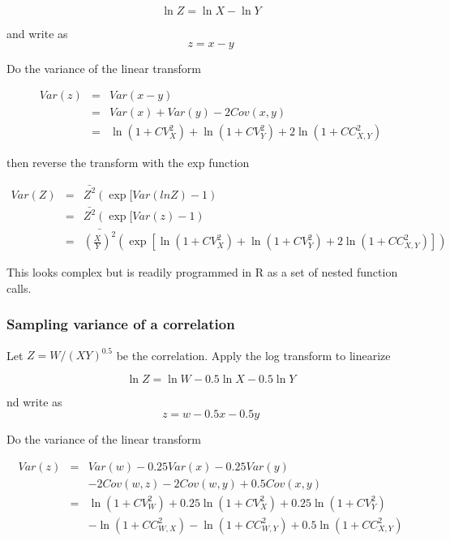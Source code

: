 \documentclass[titlepage]{article}  %
\begin{document}
\begin{displaymath}
\ln Z = \ln X - \ln Y
\end{displaymath}
 
and write as
\begin{displaymath}
z = x - y
\end{displaymath}

Do the variance of the linear transform


\begin{eqnarray*}
Var(z) & = & Var(x-y) \\
       & = & Var(x) + Var(y) - 2Cov(x,y) \\
       & = & \ln(1 + CV^{2}_{X}) + \ln(1 + CV^{2}_{Y}) + 2 \ln(1 + CC^{2}_{X,Y})
\end{eqnarray*}

then reverse the transform with the exp function

\begin{eqnarray*}
Var(Z) & = & \bar{Z^{2}}(\exp[Var(lnZ) - 1) \\
       & = & \bar{Z^{2}}(\exp[Var(z) - 1) \\
       & = & \bar{(\frac{X}{Y})^{2}}(\exp[\ln(1+CV^{2}_{X}) + \ln(1 + CV^{2}_{Y}) + 2 \ln(1 + CC^{2}_{X,Y})])
\end{eqnarray*}

This looks complex but is readily programmed in R as a set of nested function calls.


\subsubsection{Sampling variance of a correlation}
 
Let $Z = W/(XY)^{0.5}$ be the correlation. Apply the log transform to linearize

\begin{displaymath}
\ln Z = \ln W - 0.5 \ln X - 0.5 \ln Y
\end{displaymath}

nd write as
\begin{displaymath}
z = w - 0.5 x - 0.5 y
\end{displaymath}


Do the variance of the linear transform

\begin{eqnarray*}
Var(z) & = & Var(w) - 0.25 Var(x) - 0.25 Var(y) \\
       &   &  - 2 Cov(w,z) - 2 Cov(w,y) + 0.5 Cov(x,y) \\
       & = & \ln(1 + CV^{2}_{W}) + 0.25 \ln(1 + CV^{2}_{X}) + 0.25 \ln(1 + CV^{2}_{Y}) \\
       &   &  - \ln(1 + CC^{2}_{W,X}) - \ln(1 + CC^{2}_{W,Y}) + 0.5 \ln(1 + CC^{2}_{X,Y}) 
\end{eqnarray*}
\end{document}
